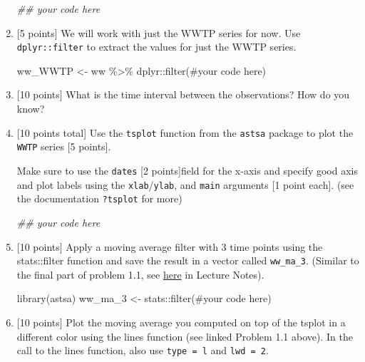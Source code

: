 \documentclass[
  letterpaper,
  DIV=11,
  numbers=noendperiod]{scrreprt}
\newenvironment{Shaded}{\begin{snugshade}}{\end{snugshade}}
\newcommand{\CommentTok}[1]{\textcolor[rgb]{0.37,0.37,0.37}{#1}}
\newcommand{\DocumentationTok}[1]{\textcolor[rgb]{0.37,0.37,0.37}{\textit{#1}}}
\newcommand{\FunctionTok}[1]{\textcolor[rgb]{0.28,0.35,0.67}{#1}}
\newcommand{\NormalTok}[1]{\textcolor[rgb]{0.00,0.23,0.31}{#1}}
\newcommand{\OtherTok}[1]{\textcolor[rgb]{0.00,0.23,0.31}{#1}}
\newcommand{\SpecialCharTok}[1]{\textcolor[rgb]{0.37,0.37,0.37}{#1}}
\begin{document}
\begin{enumerate}
\begin{Shaded}
\begin{Highlighting}[]
\DocumentationTok{\#\# your code here}
\end{Highlighting}
\end{Shaded}
\item
  {[}5 points{]} We will work with just the WWTP series for now. Use
  \texttt{dplyr::filter} to extract the values for just the WWTP series.

\begin{Shaded}
\begin{Highlighting}[]
\NormalTok{ww\_WWTP }\OtherTok{\textless{}{-}}\NormalTok{ ww }\SpecialCharTok{\%\textgreater{}\%}\NormalTok{ dplyr}\SpecialCharTok{::}\FunctionTok{filter}\NormalTok{(}\CommentTok{\#your code here)}
\end{Highlighting}
\end{Shaded}
\item
  {[}10 points{]} What is the time interval between the observations?
  How do you know?
\item
  {[}10 points total{]} Use the \texttt{tsplot} function from the
  \texttt{astsa} package to plot the \texttt{WWTP} series {[}5
  points{]}.

  Make sure to use the \texttt{dates} {[}2 points{]}field for the x-axis
  and specify good axis and plot labels using the
  \texttt{xlab}/\texttt{ylab}, and \texttt{main} arguments {[}1 point
  each{]}. (see the documentation \texttt{?tsplot} for more)

\begin{Shaded}
\begin{Highlighting}[]
\DocumentationTok{\#\# your code here}
\end{Highlighting}
\end{Shaded}
\item
  {[}10 points{]} Apply a moving average filter with 3 time points using
  the stats::filter function and save the result in a vector called
  \texttt{ww\_ma\_3}. (Similar to the final part of problem 1.1, see
  \href{http://localhost:4512/LectureNotes/Lecture2.html\#moving-averages-problem-1.1-part-c}{here}
  in Lecture Notes).

\begin{Shaded}
\begin{Highlighting}[]
\FunctionTok{library}\NormalTok{(astsa)}
\NormalTok{ww\_ma\_3 }\OtherTok{\textless{}{-}}\NormalTok{ stats}\SpecialCharTok{::}\FunctionTok{filter}\NormalTok{(}\CommentTok{\#your code here)}
\end{Highlighting}
\end{Shaded}
\item
  {[}10 points{]} Plot the moving average you computed on top of the
  tsplot in a different color using the lines function (see linked
  Problem 1.1 above). In the call to the lines function, also use
  \texttt{type\ =\ l} and \texttt{lwd\ =\ 2}.


\end{enumerate}
\end{document}
